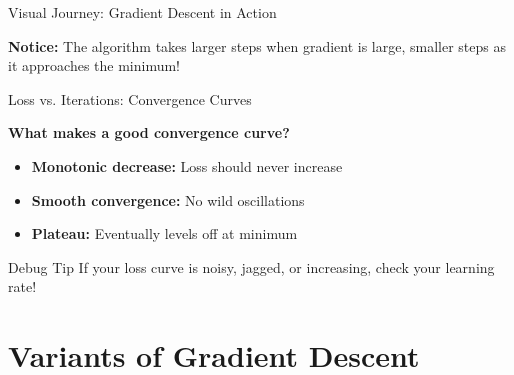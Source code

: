 \documentclass[usenames,dvipsnames]{beamer}
\begin{document}
\begin{frame}{Visual Journey: Gradient Descent in Action}
\begin{center}
    \end{center}
    
    \textbf{Notice:} The algorithm takes larger steps when gradient is large, smaller steps as it approaches the minimum!
  \end{frame}

  \begin{frame}{Loss vs. Iterations: Convergence Curves}
    
    \pause
    \textbf{What makes a good convergence curve?}
    \begin{itemize}[<+->]
        \item \textbf{Monotonic decrease:} Loss should never increase
        \item \textbf{Smooth convergence:} No wild oscillations
        \item \textbf{Plateau:} Eventually levels off at minimum
    \end{itemize}
    
    \pause
    \begin{alertbox}{Debug Tip}
    If your loss curve is noisy, jagged, or increasing, check your learning rate!
    \end{alertbox}
  \end{frame}

  \section{Variants of Gradient Descent}
\end{document}
